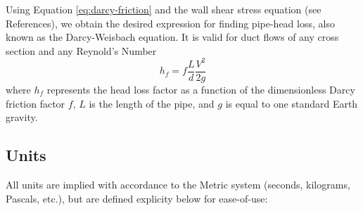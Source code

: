 \documentclass[11pt]{article} %
\numberwithin{equation}{section} %
\begin{document}
Using Equation \ref{eq:darcy-friction} and the wall shear stress equation (see References), we obtain the desired expression for finding pipe-head loss, also known as the Darcy-Weisbach equation. It is valid for duct flows of any cross section and any Reynold's Number
\begin{equation} \label{eq:darcy-weisbach}
h_{f} = f{\frac{L}{d}}{\frac{V^{2}}{2{g}}}
\end{equation}
where $h_{f}$ represents the head loss factor as a function of the dimensionless Darcy friction factor $f$, $L$ is the length of the pipe, and $g$ is equal to one standard Earth gravity.

\subsection{Units} \label{sec:units}
All units are implied with accordance to the Metric system (seconds, kilograms, Pascals, etc.), but are defined explicity below for ease-of-use:
\end{document}
